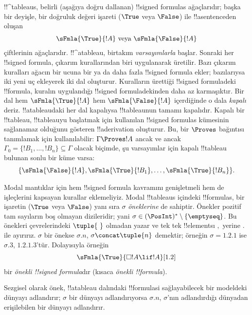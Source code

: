 



!!^{tableau}s, belirli (aşağıya doğru dallanan) !!{signed formula}s
ağaçlarıdır; başka bir deyişle, bir doğruluk değeri işareti ($\True$ veya
$\False$) ile !!a{sentence}{}den oluşan
\[
\sFmla{\True}{!A} \text{ veya } \sFmla{\False}{!A}
\]
çiftlerinin ağaçlarıdır. !!^a{tableau}, birtakım \emph{varsayımlarla}
başlar. Sonraki her !!{signed formula}, çıkarım kurallarından biri uygulanarak
üretilir. Bazı çıkarım kuralları ağacın bir ucuna bir ya da daha fazla
!!{signed formula} ekler; bazılarıysa iki yeni uç ekleyerek iki dal oluşturur.
Kuralların ürettiği !!{signed formula}{}deki !!{formula}, kuralın uygulandığı
!!{signed formula}{}dekinden daha az karmaşıktır. Bir dal hem
$\sFmla{\True}{!A}$ hem $\sFmla{\False}{!A}$ içerdiğinde o dala
\emph{kapalı} deriz. !!a{tableau}{}daki her dal kapalıysa !!{tableau}{}nun tamamı
kapalıdır. Kapalı bir !!{tableau}, !!{tableau}{}yu başlatmak için kullanılan
!!{signed formula}s kümesinin sağlanamaz olduğunu gösteren !!a{derivation}
oluşturur. Bu, bir $\Proves$ bağıntısı tanımlamak için kullanılabilir:
$\Gamma \Proves !A$ ancak ve ancak $\Gamma_0 = \{!B_1,
\dots, !B_n\} \subseteq \Gamma$ olacak biçimde, şu varsayımlar için kapalı
!!{tableau} bulunan sonlu bir küme varsa:
\[
\{\sFmla{\False}{!A}, \sFmla{\True}{!B_1}, \dots, \sFmla{\True}{!B_n}\}.
\]

Modal mantıklar için hem !!{signed formula} kavramını genişletmeli hem de
 işleçlerini kapsayan kurallar eklemeliyiz. Modal
!!{tableau}s içindeki !!{formula}s, bir işaretin ($\True$ veya $\False$) yanı
sıra $\sigma$ \emph{öneklerine} de sahiptir. Önekler pozitif tam sayıların
boş olmayan dizileridir; yani $\sigma \in (\PosInt)^* \setminus
\{\emptyseq\}$. Bu önekleri çevrelerindeki $\tuple{\ }$ olmadan yazar ve
tek tek !!{element}s{}ı $,$ yerine $.$ ile ayırırız. $\sigma$ bir önekse
$\sigma.n$, $\sigma \concat \tuple{n}$ demektir; örneğin
$\sigma = 1.2.1$ ise $\sigma.3$, $1.2.1.3$'tür. Dolayısıyla örneğin
\[
\sFmla{\True}{\Box !A \lif !A}[1.2]
\]
bir \emph{önekli !!{signed formula}}dır (kısaca \emph{önekli
  !!{formula}}).

Sezgisel olarak önek, !!a{tableau} dalındaki !!{formula}s{}i sağlayabilecek bir
modeldeki dünyayı adlandırır; $\sigma$ bir dünyayı adlandırıyorsa $\sigma.n$,
$\sigma$'nın adlandırdığı dünyadan erişilebilen bir dünyayı adlandırır.

